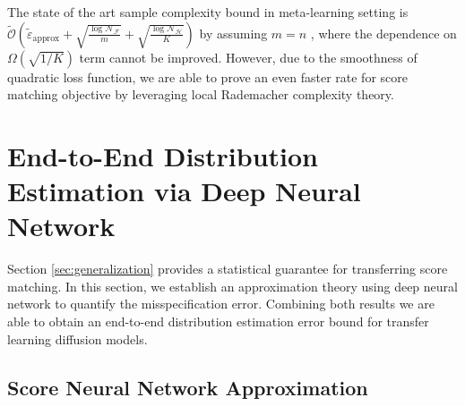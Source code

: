 \documentclass[11pt]{article}
\numberwithin{equation}{section}
\begin{document}
The state of the art sample complexity bound in meta-learning setting is $\widetilde{\mathcal{O}}\left(\widetilde{\varepsilon}_{\text{approx}}+\sqrt{\frac{\log\mathcal{N}_\mathcal{F}}{m}}+\sqrt{\frac{\log\mathcal{N}_\mathcal{H}}{K}}\right)$ by assuming $m=n$ \citep{maurer2016benefit}, where the dependence on $\Omega(\sqrt{1/K})$ term cannot be improved.
However, due to the smoothness of quadratic loss function, we are able to prove an even faster rate for score matching objective by leveraging local Rademacher complexity theory.


\section{End-to-End Distribution Estimation via Deep Neural Network}\label{sec:dist_estimation}

Section \ref{sec:generalization} provides a statistical guarantee for transferring score matching.
In this section, we establish an approximation theory using deep neural network to quantify the misspecification error.
Combining both results we are able to obtain an end-to-end distribution estimation error bound for transfer learning diffusion models.

\subsection{Score Neural Network Approximation}
\end{document}
